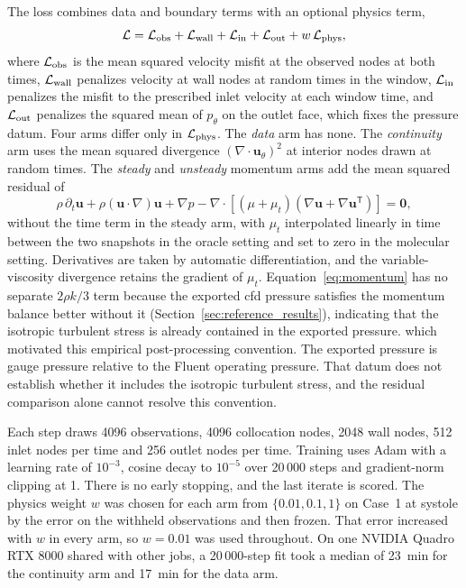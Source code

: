 \documentclass[12pt,a4paper]{article}
\newcommand{\cfdrevision}[1]{#1} %
\newcommand{\CFD}{\ac{cfd}\xspace}
\theoremstyle{definition}
\numberwithin{equation}{section}
\providecommand{\DIFaddtex}[1]{{\protect\color{blue} \sf #1}} %
\providecommand{\DIFdeltex}[1]{{\protect\color{red} \scriptsize #1}} %
\providecommand{\DIFaddbegin}{} %
\providecommand{\DIFaddend}{} %
\providecommand{\DIFdelbegin}{} %
\providecommand{\DIFdelend}{} %
\providecommand{\DIFadd}[1]{\texorpdfstring{\DIFaddtex{#1}}{#1}} %
\providecommand{\DIFdel}[1]{\texorpdfstring{\DIFdeltex{#1}}{}} %
\newcommand{\DIFscaledelfig}{0.5}
\newlength{\DIFdelgraphicswidth} %
\newlength{\DIFdelgraphicsheight} %
\newcommand{\DIFaddincludegraphics}[2][]{{\color{blue}\fbox{\DIFOincludegraphics[#1]{#2}}}} %
\newcommand{\DIFdelincludegraphics}[2][]{%
\sbox{\DIFdelgraphicsbox}{\DIFOincludegraphics[#1]{#2}}%
\settoboxwidth{\DIFdelgraphicswidth}{\DIFdelgraphicsbox} %
\settoboxtotalheight{\DIFdelgraphicsheight}{\DIFdelgraphicsbox} %
\scalebox{\DIFscaledelfig}{%
\parbox[b]{\DIFdelgraphicswidth}{\usebox{\DIFdelgraphicsbox}\\[-\baselineskip] \rule{\DIFdelgraphicswidth}{0em}}\llap{\resizebox{\DIFdelgraphicswidth}{\DIFdelgraphicsheight}{%
\setlength{\unitlength}{\DIFdelgraphicswidth}%
\begin{picture}(1,1)%
\thicklines\linethickness{2pt} %
{\color[rgb]{1,0,0}\put(0,0){\framebox(1,1){}}}%
{\color[rgb]{1,0,0}\put(0,0){\line( 1,1){1}}}%
{\color[rgb]{1,0,0}\put(0,1){\line(1,-1){1}}}%
\end{picture}%
}\hspace*{3pt}}} %
} %
\DeclareRobustCommand{\DIFaddbegin}{\DIFOaddbegin \let\includegraphics\DIFaddincludegraphics} %
\DeclareRobustCommand{\DIFaddend}{\DIFOaddend \let\includegraphics\DIFOincludegraphics} %
\DeclareRobustCommand{\DIFdelbegin}{\DIFOdelbegin \let\includegraphics\DIFdelincludegraphics} %
\DeclareRobustCommand{\DIFdelend}{\DIFOaddend \let\includegraphics\DIFOincludegraphics} %
\begin{document}
The loss combines data and boundary terms with an optional physics term,
\begin{equation}
\mathcal L=\mathcal L_{\rm obs}+\mathcal L_{\rm wall}+\mathcal L_{\rm in}+\mathcal L_{\rm out}+w\,\mathcal L_{\rm phys},
\label{eq:loss}
\end{equation}
where $\mathcal L_{\rm obs}$ is the mean squared velocity misfit at the observed nodes at both times, $\mathcal L_{\rm wall}$ penalizes velocity at wall nodes at random times in the window, $\mathcal L_{\rm in}$ penalizes the misfit to the prescribed inlet velocity at each window time, and $\mathcal L_{\rm out}$ penalizes the squared mean of $p_\theta$ on the outlet face, which fixes the pressure datum. Four arms differ only in $\mathcal L_{\rm phys}$. The \emph{data} arm has none. The \emph{continuity} arm uses the mean squared divergence $(\nabla\cdot\mathbf u_\theta)^2$ at interior nodes drawn at random times. The \emph{steady} and \emph{unsteady} momentum arms add the mean squared residual of
\begin{equation}
\rho\,\partial_t\mathbf u+\rho(\mathbf u\cdot\nabla)\mathbf u
+\nabla p-\nabla\cdot\left[(\mu+\mu_t)
(\nabla\mathbf u+\nabla\mathbf u^{\mathsf T})\right]=\mathbf 0,
\label{eq:momentum}
\end{equation}
without the time term in the steady arm, with $\mu_t$ interpolated linearly in time between the two snapshots in the oracle setting and set to zero in the molecular setting. Derivatives are taken by automatic differentiation, and the variable-viscosity divergence retains the gradient of $\mu_t$. Equation~\eqref{eq:momentum} has no separate $2\rho k/3$ term because the exported \CFD pressure satisfies the momentum balance better without it (Section~\ref{sec:reference_results}), \DIFdelbegin \DIFdel{indicating that the isotropic turbulent stress is already contained in the exported pressure. }\DIFdelend \DIFaddbegin \DIFadd{which motivated this empirical post-processing convention. \cfdrevision{The exported pressure is gauge pressure relative to the Fluent operating pressure. That datum does not establish whether it includes the isotropic turbulent stress, and the residual comparison alone cannot resolve this convention.}
}\DIFaddend 

Each step draws 4096 observations, 4096 collocation nodes, 2048 wall nodes, 512 inlet nodes per time and 256 outlet nodes per time. Training uses Adam with a learning rate of $10^{-3}$, cosine decay to $10^{-5}$ over 20\,000 steps and gradient-norm clipping at 1. There is no early stopping, and the last iterate is scored. The physics weight $w$ was chosen for each arm from $\{0.01,0.1,1\}$ on Case~1 at systole by the error on the withheld observations and then frozen. That error increased with $w$ in every arm, so $w=0.01$ was used throughout. On one NVIDIA Quadro RTX 8000 shared with other jobs, a 20\,000-step fit took a median of 23~min for the continuity arm and 17~min for the data arm.
\end{document}
